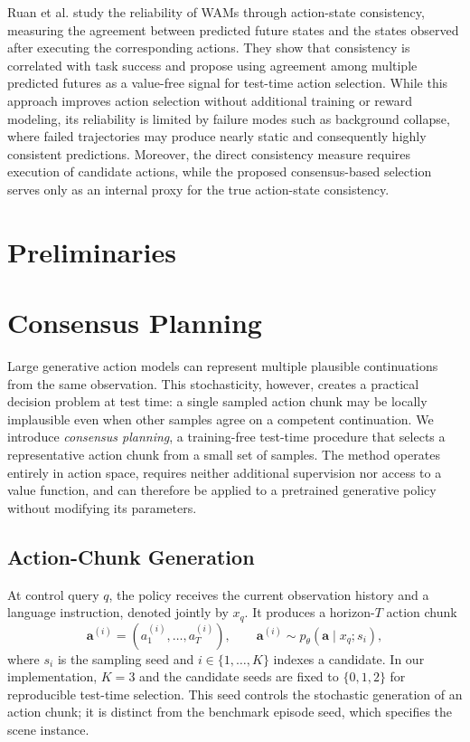 \documentclass{article}
\begin{document}
Ruan et al. \cite{ruan2026future} study the reliability of WAMs through action-state consistency, measuring the agreement between predicted future states and the states observed after executing the corresponding actions. They show that consistency is correlated with task success and propose using agreement among multiple predicted futures as a value-free signal for test-time action selection. While this approach improves action selection without additional training or reward modeling, its reliability is limited by failure modes such as background collapse, where failed trajectories may produce nearly static and consequently highly consistent predictions. Moreover, the direct consistency measure requires execution of candidate actions, while the proposed consensus-based selection serves only as an internal proxy for the true action-state consistency.


\section{Preliminaries}

\section{Consensus Planning}
\label{sec:method}

Large generative action models can represent multiple plausible continuations
from the same observation. This stochasticity, however, creates a practical
decision problem at test time: a single sampled action chunk may be locally
implausible even when other samples agree on a competent continuation. We
introduce \emph{consensus planning}, a training-free test-time procedure that
selects a representative action chunk from a small set of samples. The method
operates entirely in action space, requires neither additional supervision nor
access to a value function, and can therefore be applied to a pretrained
generative policy without modifying its parameters.

\subsection{Action-Chunk Generation}

At control query $q$, the policy receives the current observation history and a
language instruction, denoted jointly by $x_q$. It produces a horizon-$T$
action chunk
\begin{equation}
    \mathbf{a}^{(i)} = \left(a^{(i)}_1,\ldots,a^{(i)}_T\right),
    \qquad \mathbf{a}^{(i)} \sim p_\theta(\mathbf{a}\mid x_q; s_i),
    \label{eq:candidates}
\end{equation}
where $s_i$ is the sampling seed and $i\in\{1,\ldots,K\}$ indexes a candidate.
In our implementation, $K=3$ and the candidate seeds are fixed to $\{0,1,2\}$
for reproducible test-time selection. This seed controls the stochastic
generation of an action chunk; it is distinct from the benchmark episode seed,
which specifies the scene instance.
\end{document}
